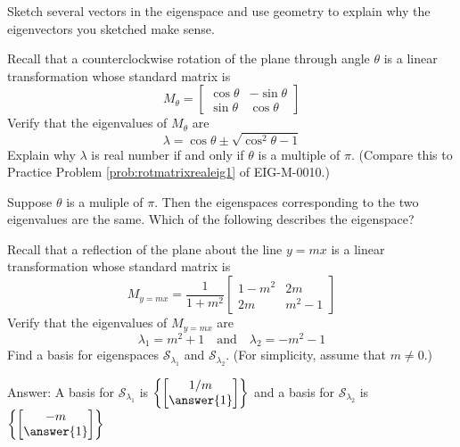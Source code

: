 \documentclass{ximera}
\begin{document}
\begin{problem}
\begin{problem}
Sketch several vectors in the eigenspace and use geometry to explain why the eigenvectors you sketched make sense.
\end{problem}

\begin{problem}\label{prob:rotmatrixrealeig2}
Recall that a counterclockwise rotation of the plane through angle $\theta$ is a linear transformation whose standard matrix is $$M_{\theta}=\begin{bmatrix}\cos\theta&-\sin\theta\\\sin\theta&\cos\theta\end{bmatrix}$$
Verify that the eigenvalues of $M_{\theta}$ are
$$\lambda=\cos\theta\pm\sqrt{\cos^2\theta-1}$$
Explain why $\lambda$ is real number if and only if $\theta$ is a multiple of $\pi$.  (Compare this to Practice Problem \ref{prob:rotmatrixrealeig1} of EIG-M-0010.)

Suppose $\theta$ is a muliple of $\pi$.  Then the eigenspaces corresponding to the two eigenvalues are the same.  Which of the following describes the eigenspace?
\begin{multipleChoice}
\end{multipleChoice}

\end{problem}

\begin{problem}
Recall that a reflection of the plane about the line $y=mx$ is a linear transformation whose standard matrix is
$$M_{y=mx}=\frac{1}{1+m^2}\begin{bmatrix}
1-m^2 & 2m \\
2m & m^2-1
\end{bmatrix}$$
Verify that the eigenvalues of $M_{y=mx}$ are
$$\lambda_1=m^2+1\quad\text{and}\quad\lambda_2=-m^2-1$$
Find a basis for eigenspaces $\mathcal{S}_{\lambda_1}$ and $\mathcal{S}_{\lambda_2}$.  (For simplicity, assume that $m\neq 0$.)

Answer:  A basis for $\mathcal{S}_{\lambda_1}$ is $\left\{\begin{bmatrix}1/m\\\answer{1}\end{bmatrix}\right\}$
and a basis for $\mathcal{S}_{\lambda_2}$ is $\left\{\begin{bmatrix}-m\\\answer{1}\end{bmatrix}\right\}$


\end{problem}
\end{problem}
\end{document}
